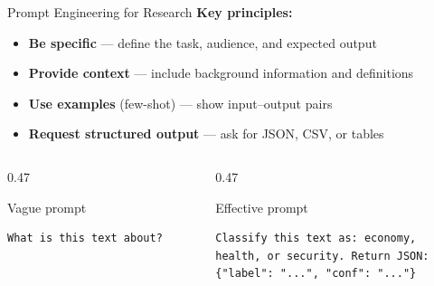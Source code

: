 \documentclass[aspectratio=169]{beamer}
\begin{document}
\begin{frame}[fragile]{Prompt Engineering for Research}
    \small
    \textbf{Key principles:}
    \begin{itemize}\setlength\itemsep{0pt}
        \item {} \textbf{Be specific} --- define the task, audience, and expected output
        \item {} \textbf{Provide context} --- include background information and definitions
        \item {} \textbf{Use examples} (few-shot) --- show input--output pairs
        \item {} \textbf{Request structured output} --- ask for JSON, CSV, or tables
    \end{itemize}

    \vspace{0.1cm}
    \begin{columns}[T]
        \begin{column}{0.47\textwidth}
            \begin{alertblock}{Vague prompt}
                \footnotesize
\begin{verbatim}
What is this text about?
\end{verbatim}
            \end{alertblock}
        \end{column}
        \begin{column}{0.47\textwidth}
            \begin{block}{Effective prompt}
                \footnotesize
\begin{verbatim}
Classify this text as: economy,
health, or security. Return JSON:
{"label": "...", "conf": "..."}
\end{verbatim}
            \end{block}
        \end{column}
    \end{columns}
\end{frame}
\end{document}
